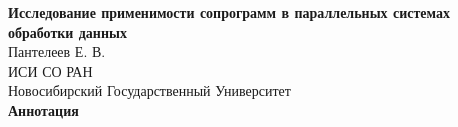 \documentclass[a4paper,14pt]{extarticle}
\begin{document}
\begin{center}
	\textbf{Исследование применимости сопрограмм в параллельных системах обработки данных} \\
	Пантелеев Е. В. \\
	ИСИ СО РАН \\
	Новосибирский Государственный Университет \\
	\vspace{0.5cm}
	\textbf{Аннотация}
\end{center}

\end{document}
